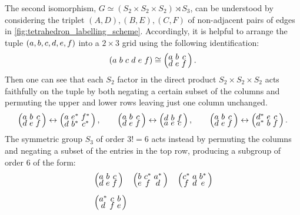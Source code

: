 \documentclass[notitlepage, 11pt, letterpaper]{amsart}
\begin{document}
\begin{rem}
    The second isomorphism, $G \simeq (S_2 \times S_2 \times S_2) \rtimes S_3$, can be understood by considering the triplet $(A,D), (B,E), (C,F)$ of non-adjacent pairs of edges in \cref{fig:tetrahedron_labelling_scheme}.
    Accordingly, it is helpful to arrange the tuple $(a,b,c,d,e,f)$ into a $2\times 3$ grid using the following identification:
    \begin{equation}
        \left(\tightsextuple{\ea & \eb & \ec & \ed & \ee & \ef}\right)
        \cong
        \left(\tightsextuple{\ea & \eb & \ec \\ \ed & \ee & \ef}\right).
    \end{equation}
    Then one can see that each $S_2$ factor in the direct product $S_2 \times S_2 \times S_2$ acts faithfully on the tuple by both negating a certain subset of the columns and permuting the upper and lower rows leaving just one column unchanged.
    \begin{equation}
        \left(\tightsextuple{\ea & \eb & \ec \\ \ed & \ee & \ef}\right)
        \leftrightarrow
        \left(\tightsextuple{\ea & \ee^* & \ef^* \\ \ed & \eb^* & \ec^*}\right),
        \qquad
        \left(\tightsextuple{\ea & \eb & \ec \\ \ed & \ee & \ef}\right)
        \leftrightarrow
        \left(\tightsextuple{\ed & \eb & \ef \\ \ea & \ee & \ec}\right),
        \qquad
        \left(\tightsextuple{\ea & \eb & \ec \\ \ed & \ee & \ef}\right)
        \leftrightarrow
        \left(\tightsextuple{\ed^* & \ee & \ec \\ \ea^* & \eb & \ef}\right).
    \end{equation}
    The symmetric group $S_3$ of order $3! = 6$ acts instead by permuting the columns and negating a subset of the entries in the top row, producing a subgroup of order $6$ of the form:
    \begin{equation}
        \begin{alignedat}{3}
            &\left(\tightsextuple{\ea & \eb & \ec \\ \ed & \ee & \ef}\right)
            \quad
            &&\left(\tightsextuple{\eb & \ec^* & \ea^* \\ \ee & \ef & \ed}\right)
            \quad
            &&\left(\tightsextuple{\ec^* & \ea & \eb^*  \\ \ef & \ed & \ee }\right)\\[0.5em]
            &\left(\tightsextuple{\ea^* & \ec & \eb \\ \ed & \ef & \ee}\right)

\end{alignedat}
\end{equation}
\end{rem}
\end{document}
